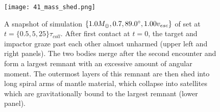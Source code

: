 \begin{figure}[h!]
\begin{center}
\texttt{[image: 41\_mass\_shed.png]}
\caption{A snapshot of simulation $\{ 1.0 M_{\oplus}, 0.7, 89.0 ^\circ, 1.00 v_{esc}\}$ of set \css at $t = \{0.5, 5, 25\} \tau_{coll}$. After first contact at $t = 0$, the target and impactor graze past each other almost unharmed (upper left and right panels). The two bodies merge after the second encounter and form a largest remnant with an excessive amount of angular moment. The outermost layers of this remnant are then shed into long spiral arms of mantle material, which collapse into satellites which are gravitationally bound to the largest remnant (lower panel).}
\label{ch03_fig41}
\end{center}
\end{figure}


